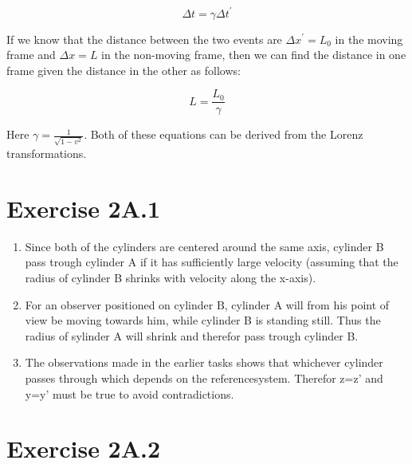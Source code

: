 \documentclass[a4paper,10pt,english]{article}
\begin{document}
\begin{equation}\label{eq:time_dila}
\Delta t=\gamma\Delta t^{\prime}
\end{equation}

If we know that the distance between the two events are $\Delta x^{\prime}=L_{0}$ in the moving frame and $\Delta x=L$ in the non-moving frame, then we can find the distance in one frame given the distance in the other as follows:

\begin{equation}\label{eq:len_con}
L=\frac{L_{0}}{\gamma}
\end{equation}

Here $\gamma=\frac{1}{\sqrt{1-v^{2}}}$. Both of these equations can be derived from the Lorenz transformations.

\newpage









\section*{Exercise 2A.1}

\begin{enumerate}

\item Since both of the cylinders are centered around the same axis, cylinder B pass trough cylinder A if it has sufficiently large velocity (assuming that the radius of cylinder B shrinks with velocity along the x-axis).

\item For an observer positioned on cylinder B, cylinder A will from his point of view be moving towards him, while  cylinder B is standing still. Thus the radius of sylinder A will shrink and therefor pass trough cylinder B.

\item The observations made in the earlier tasks shows that whichever cylinder passes through which depends on the referencesystem. Therefor z=z' and y=y' must be true to avoid contradictions.\\

\end{enumerate}









\section*{Exercise 2A.2}
\end{document}
